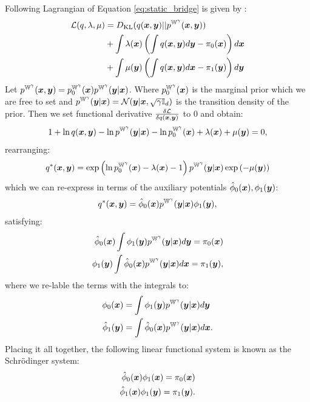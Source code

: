 \documentclass[a4paper,12pt,twoside,openright]{report}
\theoremstyle{definition}
\begin{document}
Following \cite{pavon2018data} Lagrangian of Equation \ref{eq:static_bridge} is given by :
\begin{align}\label{eq:schro_lagrangian}
    {\mathcal{L}}(q, \lambda,  \mu) &=  D_{\mathrm{KL}} (q({\bm{x}},{\bm{y}})  || p^{\mathbb{W}^{\gamma}}({\bm{x}},{\bm{y}}))  \nonumber\\
    &+ \int \lambda({\bm{x}})\left( \int q({\bm{x}},{\bm{y}})d{\bm{y}} -\pi_0({\bm{x}})\right)d{\bm{x}} \nonumber \\
    &+ \int \mu({\bm{y}}) \left(\int q({\bm{x}},{\bm{y}}) d{\bm{x}} - \pi_1({\bm{y}})\right) d{\bm{y}}
\end{align}
Let $p^{\mathbb{W}^{\gamma}}({\bm{x}},{\bm{y}}) = p^{\mathbb{W}^{\gamma}}_0({\bm{x}})p^{\mathbb{W}^{\gamma}}({\bm{y}}|{\bm{x}})$. Where $p^{\mathbb{W}^{\gamma}}_0({\bm{x}})$ is the marginal prior which we are free to set and $p^{\mathbb{W}^{\gamma}}({\bm{y}}|{\bm{x}})={\mathcal{N}}({\bm{y}} | {\bm{x}}, \sqrt{\gamma}{\mathbb{I}_d})$ is the transition density of the prior. Then we set functional derivative $\frac{\delta {\mathcal{L}}}{\delta q({\bm{x}}, {\bm{y}})}$ to 0 and obtain:
\begin{align*}
    1 + \ln q({\bm{x}}, {\bm{y}})  - \ln p^{\mathbb{W}^{\gamma}}({\bm{y}}|{\bm{x}})
    - \ln p^{\mathbb{W}^{\gamma}}_0({\bm{x}})+ \lambda({\bm{x}})
+ \mu({\bm{y}}) = 0, \nonumber
\end{align*}
rearranging:
\begin{align*}
{q^{*}({\bm{x}}, {\bm{y}}) }  = \exp\left(  \ln p^{\mathbb{W}^{\gamma}}_0({\bm{x}}) -\lambda({\bm{x}}) -1\right)p^{\mathbb{W}^{\gamma}}({\bm{y}}|{\bm{x}})\exp\left(- \mu({\bm{y}})\right) \nonumber
\end{align*}
which we can re-express in terms of the auxiliary potentials ${\hat{\phi}}_0({\bm{x}}), \phi_1({\bm{y}})$:
\begin{align*}
{q^{*}({\bm{x}}, {\bm{y}}) }  = {\hat{\phi}}_0({\bm{x}})p^{\mathbb{W}^{\gamma}}({\bm{y}}|{\bm{x}})\phi_1({\bm{y}}), \nonumber
\end{align*}
satisfying:
\begin{align}
    {\hat{\phi}}_0({\bm{x}}) \int \phi_1({\bm{y}}) p^{\mathbb{W}^{\gamma}}({\bm{y}}|{\bm{x}}) d{\bm{y}} = \pi_0({\bm{x}})  \nonumber\\ 
    \phi_1({\bm{y}}) \int {\hat{\phi}}_0({\bm{x}}) p^{\mathbb{W}^{\gamma}}({\bm{y}}|{\bm{x}}) d{\bm{x}} = \pi_1({\bm{y}}), \nonumber
\end{align}
where we re-lable the terms with the integrals to:
\begin{align}
    \phi_0({\bm{x}}) &= \int \phi_1({\bm{y}}) p^{\mathbb{W}^{\gamma}}({\bm{y}}|{\bm{x}}) d{\bm{y}} \nonumber\\ 
    {\hat{\phi}}_1({\bm{y}}) &= \int {\hat{\phi}}_0({\bm{x}}) p^{\mathbb{W}^{\gamma}}({\bm{y}}|{\bm{x}}) d{\bm{x}}. \nonumber
\end{align}
Placing it all together, the following linear functional system is known as the Schrödinger system:
\begin{align}
    {\hat{\phi}}_0({\bm{x}}) \phi_1({\bm{x}})  = \pi_0({\bm{x}})  \nonumber \\ 
    {\hat{\phi}}_1({\bm{x}}) \phi_1({\bm{y}})  = \pi_1({\bm{y}}).
\end{align}
\end{document}
